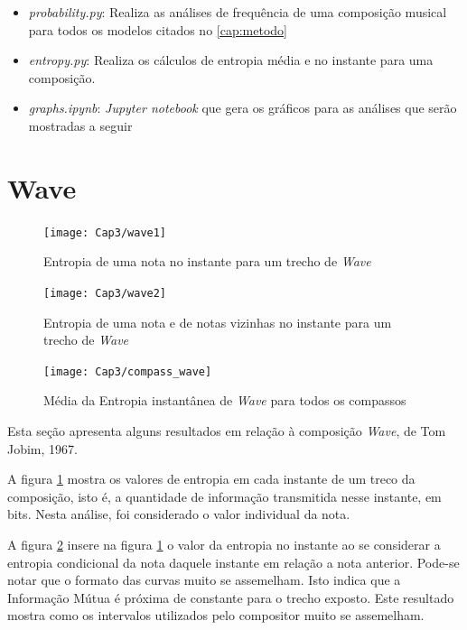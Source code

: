 \begin{itemize}
    \item \textit{probability.py}: Realiza as análises de frequência de uma composição musical para todos os modelos citados no \ref{cap:metodo}
    \item \textit{entropy.py}: Realiza os cálculos de entropia média e no instante para uma composição.
    \item \textit{graphs.ipynb}: \textit{Jupyter notebook} que gera os gráficos para as análises que serão mostradas a seguir
\end{itemize}

\section{Wave}

\begin{figure}[h]
\centering
\texttt{[image: Cap3/wave1]}
\caption{Entropia de uma nota no instante para um trecho de \textit{Wave}}
\label{fig:wave1}
\end{figure}

\begin{figure}[h]
\centering
\texttt{[image: Cap3/wave2]}
\caption{Entropia de uma nota e de notas vizinhas no instante para um trecho de \textit{Wave}}
\label{fig:wave2}
\end{figure}

\begin{figure}[h]
\centering
\texttt{[image: Cap3/compass\_wave]}
\caption{Média da Entropia instantânea de \textit{Wave} para todos os compassos}
\label{fig:compass_wave}
\end{figure}
Esta seção apresenta alguns resultados em relação à composição \textit{Wave}, de Tom Jobim, 1967. \cite{wave}

A figura \ref{fig:wave1} mostra os valores de entropia em cada instante de um treco da composição, isto é, a quantidade de informação transmitida nesse instante, em bits. Nesta análise, foi considerado o valor individual da nota.


A figura \ref{fig:wave2} insere na figura \ref{fig:wave1} o valor da entropia no instante ao se considerar a entropia condicional da nota daquele instante em relação a nota anterior. Pode-se notar que o formato das curvas muito se assemelham. Isto indica que a Informação Mútua é próxima de constante para o trecho exposto. Este resultado mostra como os intervalos utilizados pelo compositor muito se assemelham.


